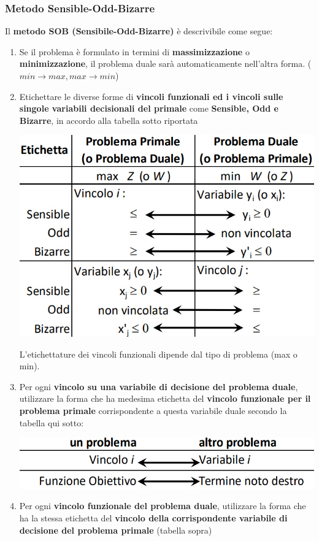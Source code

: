 \documentclass[12pt]{article}
\begin{document}
\subsubsection{Metodo Sensible-Odd-Bizarre}
Il \textbf{metodo SOB (Sensibile-Odd-Bizarre)} è descrivibile come segue:
\begin{enumerate}
    \item Se il problema è formulato in termini di \textbf{massimizzazione} o \textbf{minimizzazione}, il problema duale sarà automaticamente nell'altra forma. ($min \rightarrow max, max \rightarrow min$)
    \item Etichettare le diverse forme di \textbf{vincoli funzionali ed i vincoli sulle singole variabili decisionali del primale} come \textbf{Sensible, Odd e Bizarre}, in accordo alla tabella sotto riportata
    \begin{center}
        \includegraphics[width = 0.60\linewidth]{Images/59.png}
    \end{center}
    L'etichettature dei vincoli funzionali dipende dal tipo di problema (max o min).
    \item Per ogni \textbf{vincolo su una variabile di decisione del problema duale}, utilizzare la forma che ha medesima etichetta del \textbf{vincolo funzionale per il problema primale} corrispondente
    a questa variabile duale secondo la tabella qui sotto:
    \begin{center}
        \includegraphics[width = 0.60\linewidth]{Images/60.png}
    \end{center}
    \item Per ogni \textbf{vincolo funzionale del problema duale}, utilizzare la forma che ha la stessa etichetta del \textbf{vincolo della corrispondente variabile di decisione del problema primale} (tabella sopra)
\end{enumerate}
\end{document}
